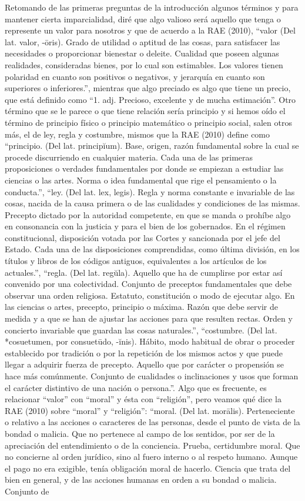 Retomando de las primeras preguntas de la introducción algunos términos y para mantener cierta imparcialidad, diré que algo valioso será aquello que tenga o represente un valor para nosotros y que de acuerdo a la RAE (2010), “valor (Del lat. valor, -ōris). Grado de utilidad o aptitud de las cosas, para satisfacer las necesidades o proporcionar bienestar o deleite. Cualidad que poseen algunas realidades, consideradas bienes, por lo cual son estimables. Los valores tienen polaridad en cuanto son positivos o negativos, y jerarquía en cuanto son superiores o inferiores.”, mientras que algo preciado es algo que tiene un precio, que está definido como “1. adj. Precioso, excelente y de mucha estimación”. Otro término que se le parece o que tiene relación sería principio y si hemos oído el término de principio físico o principio matemático o principio social, salen otros más, el de ley, regla y costumbre, mismos que la RAE (2010) define como “principio. (Del lat. principĭum). Base, origen, razón fundamental sobre la cual se procede discurriendo en cualquier materia. Cada una de las primeras proposiciones o verdades fundamentales por donde se empiezan a estudiar las ciencias o las artes. Norma o idea fundamental que rige el pensamiento o la conducta.”, “ley. (Del lat. lex, legis). Regla y norma constante e invariable de las cosas, nacida de la causa primera o de las cualidades y condiciones de las mismas. Precepto dictado por la autoridad competente, en que se manda o prohíbe algo en consonancia con la justicia y para el bien de los gobernados. En el régimen constitucional, disposición votada por las Cortes y sancionada por el jefe del Estado. Cada una de las disposiciones comprendidas, como última división, en los títulos y libros de los códigos antiguos, equivalentes a los artículos de los actuales.”, “regla. (Del lat. regŭla). Aquello que ha de cumplirse por estar así convenido por una colectividad. Conjunto de preceptos fundamentales que debe observar una orden religiosa. Estatuto, constitución o modo de ejecutar algo. En las ciencias o artes, precepto, principio o máxima. Razón que debe servir de medida y a que se han de ajustar las acciones para que resulten rectas. Orden y concierto invariable que guardan las cosas naturales.”, “costumbre. (Del lat. *cosuetumen, por consuetūdo, -ĭnis). Hábito, modo habitual de obrar o proceder establecido por tradición o por la repetición de los mismos actos y que puede llegar a adquirir fuerza de precepto. Aquello que por carácter o propensión se hace más comúnmente. Conjunto de cualidades o inclinaciones y usos que forman el carácter distintivo de una nación o persona.”. Algo que es frecuente, es relacionar “valor” con “moral” y ésta con “religión”, pero veamos qué dice la RAE (2010) sobre “moral” y “religión”: “moral. (Del lat. morālis). Perteneciente o relativo a las acciones o caracteres de las personas, desde el punto de vista de la bondad o malicia. Que no pertenece al campo de los sentidos, por ser de la apreciación del entendimiento o de la conciencia. Prueba, certidumbre moral. Que no concierne al orden jurídico, sino al fuero interno o al respeto humano. Aunque el pago no era exigible, tenía obligación moral de hacerlo. Ciencia que trata del bien en general, y de las acciones humanas en orden a su bondad o malicia. Conjunto de 